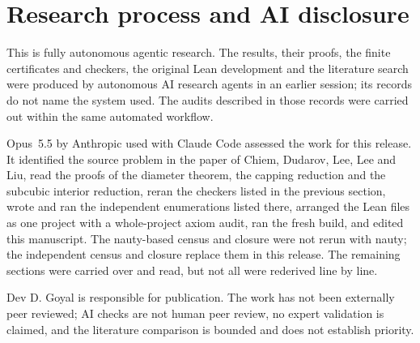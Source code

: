 \documentclass[11pt,a4paper]{article}
\theoremstyle{definition}\newtheorem{definition}[theorem]{Definition}
\theoremstyle{remark}\newtheorem{remark}[theorem]{Remark}
\begin{document}
\section{Research process and AI disclosure}\label{sec:disclosure}
This is fully autonomous agentic research. The results, their proofs, the
finite certificates and checkers, the original Lean development and the
literature search were produced by autonomous AI research agents in an
earlier session; its records do not name the system used. The audits
described in those records were carried out within the same automated
workflow.

Opus~5.5 by Anthropic used with Claude Code assessed the work for this
release. It identified the source problem in the paper of Chiem, Dudarov,
Lee, Lee and Liu, read the proofs of the diameter theorem, the capping
reduction and the subcubic interior reduction, reran the checkers listed
in the previous section, wrote and ran the independent enumerations listed
there, arranged the Lean files as one project with a whole-project axiom
audit, ran the fresh build, and edited this manuscript. The nauty-based
census and closure were not rerun with nauty; the independent census and
closure replace them in this release. The remaining sections were carried
over and read, but not all were rederived line by line.

Dev D. Goyal is responsible for publication. The work has not been
externally peer reviewed; AI checks are not human peer review, no expert
validation is claimed, and the literature comparison is bounded and does
not establish priority.
\end{document}
